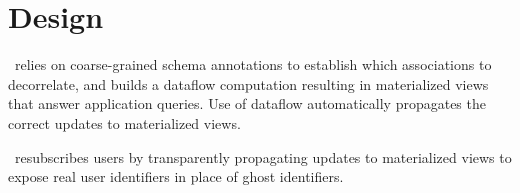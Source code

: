 \section{Design}
\sys~relies on coarse-grained schema annotations to establish which associations to decorrelate, and
builds a dataflow computation resulting in materialized views that answer application queries. Use
of dataflow automatically propagates the correct updates to materialized views.

\sys~resubscribes
users by transparently propagating updates to materialized views to expose real user identifiers in
place of ghost identifiers.
